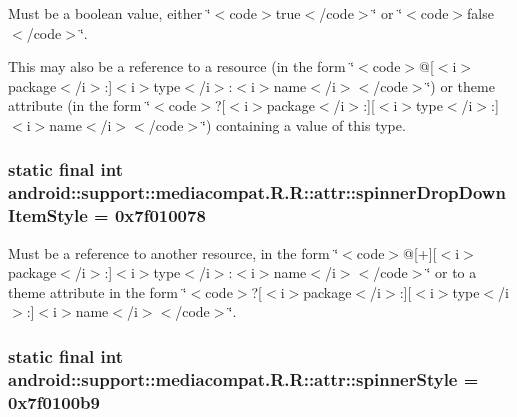 Must be a boolean value, either \char`\"{}$<$code$>$true$<$/code$>$\char`\"{} or \char`\"{}$<$code$>$false$<$/code$>$\char`\"{}. 

This may also be a reference to a resource (in the form \char`\"{}$<$code$>$@\mbox{[}$<$i$>$package$<$/i$>$:\mbox{]}$<$i$>$type$<$/i$>$:$<$i$>$name$<$/i$>$$<$/code$>$\char`\"{}) or theme attribute (in the form \char`\"{}$<$code$>$?\mbox{[}$<$i$>$package$<$/i$>$:\mbox{]}\mbox{[}$<$i$>$type$<$/i$>$:\mbox{]}$<$i$>$name$<$/i$>$$<$/code$>$\char`\"{}) containing a value of this type. \hypertarget{classandroid_1_1support_1_1mediacompat_1_1_r_1_1attr_ca22fc4ae145cd88f06237a75d311011}{
\subsubsection[{spinnerDropDownItemStyle}]{\setlength{\rightskip}{0pt plus 5cm}static final int android::support::mediacompat.R.R::attr::spinnerDropDownItemStyle = 0x7f010078}}
\label{classandroid_1_1support_1_1mediacompat_1_1_r_1_1attr_ca22fc4ae145cd88f06237a75d311011}


Must be a reference to another resource, in the form \char`\"{}$<$code$>$@\mbox{[}+\mbox{]}\mbox{[}$<$i$>$package$<$/i$>$:\mbox{]}$<$i$>$type$<$/i$>$:$<$i$>$name$<$/i$>$$<$/code$>$\char`\"{} or to a theme attribute in the form \char`\"{}$<$code$>$?\mbox{[}$<$i$>$package$<$/i$>$:\mbox{]}\mbox{[}$<$i$>$type$<$/i$>$:\mbox{]}$<$i$>$name$<$/i$>$$<$/code$>$\char`\"{}. \hypertarget{classandroid_1_1support_1_1mediacompat_1_1_r_1_1attr_683415e92ef6cf5c3fbdb617e0f8399d}{
\subsubsection[{spinnerStyle}]{\setlength{\rightskip}{0pt plus 5cm}static final int android::support::mediacompat.R.R::attr::spinnerStyle = 0x7f0100b9}}
\label{classandroid_1_1support_1_1mediacompat_1_1_r_1_1attr_683415e92ef6cf5c3fbdb617e0f8399d}


